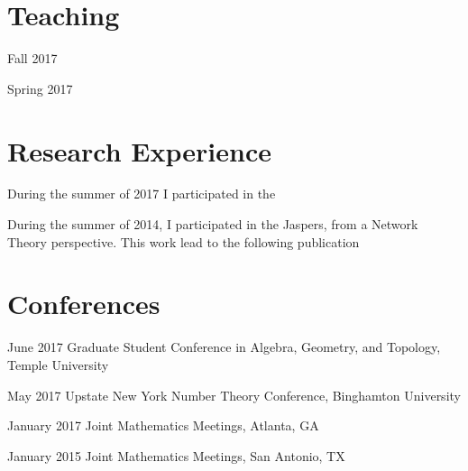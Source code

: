 \documentclass[11pt,letterpaper]{moderncv}
\renewcommand{\cvitem}[3][.25em]{%
  \begin{mycvlist}
    \item[#2] #3
    \end{mycvlist}
    \addvspace{#1}}
\begin{document}
\makecvtitle



\section{Teaching}
  \cvitem{}{Fall 2017}{}
  \cvitem{}{Spring 2017}{}
 
\section{Research Experience}
  \cvitem{}{During the summer of 2017 I participated in the}
  \cvitem{}{During the summer of 2014, I participated in the Jaspers, from a Network Theory perspective. This work lead to the following publication }

\section{Conferences}
 \cvitem{June 2017}{Graduate Student Conference in Algebra, Geometry, and Topology, Temple University}
\cvitem{May 2017}{Upstate New York Number Theory Conference, Binghamton University}
\cvitem{January 2017}{Joint Mathematics Meetings, Atlanta, GA}
\cvitem{January 2015}{Joint Mathematics Meetings, San Antonio, TX}
\end{document}
